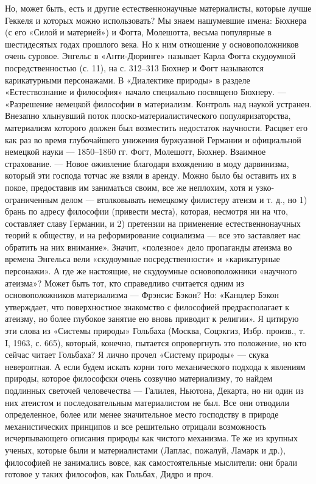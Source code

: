 Но, может быть, есть и другие естественнонаучные материалисты, которые
лучше  Геккеля  и  которых  можно использовать?  Мы  знаем  нашумевшие
имена:  Бюхнера  (с  его  «Силой  и  материей»)  и  Фогта,  Молешотта,
весьма  популярные  в  шестидесятых  годах прошлого  века.  Но  к  ним
отношение у  основоположников очень суровое. Энгельс  в «Анти-Дюринге»
называет  Карла  Фогта скудоумной  посредственностью  (с.  11), на  с.
312--313  Бюхнер  и  Фогт   называются  карикатурными  персонажами.  В
«Диалектике  природы» в  разделе «Естествознание  и философия»  начало
специально  посвящено Бюхнеру.  --- «Разрешение  немецкой философии  в
материализм. Контроль  над наукой  устранен. Внезапно  хлынувший поток
плоско-материалистического  популяризаторства,   материализм  которого
должен был  возместить недостаток  научности. Расцвет  его как  раз во
время глубочайшего унижения буржуазной Германии и официальной немецкой
науки --- 1850--1860 гг. Фогт, Молешотт, Бюхнер. Взаимное страхование.
---  Новое оживление  благодаря вхождению  в моду  дарвинизма, который
эти  господа  тотчас  же  взяли  в  аренду.  Можно  было  бы  оставить
их  в  покое,  предоставив  им  заниматься  своим,  все  же  неплохим,
хотя и  узко-ограниченным делом  --- втолковывать  немецкому филистеру
атеизм и  т. д.,  но 1)  брань по  адресу философии  (привести места),
которая,  несмотря  ни  на  что,   составляет  славу  Германии,  и  2)
претензии  на  применение  естественнонаучных  теорий  к  обществу,  и
на  реформирование  социализма ---  все  это  заставляет нас  обратить
на  них  внимание».  Значит,  «полезное» дело  пропаганды  атеизма  во
времена  Энгельса вели  «скудоумные посредственности»  и «карикатурные
персонажи».  А   где  же  настоящие,  не   скудоумные  основоположники
«научного атеизма»? Может быть тот, кто справедливо считается одним из
основоположников материализма  --- Фрэнсис  Бэкон? Но:  «Канцлер Бэкон
утверждает, что поверхностное  знакомство с философией предрасполагает
к атеизму, но  более глубокое занятие ею вновь приводит  к религии». Я
цитирую  эти слова  из «Системы  природы» Гольбаха  (Москва, Соцэкгиз,
Избр.  произв.,  т.  I,  1963, с.  665),  который,  конечно,  пытается
опровергнуть это  положение, но  кто сейчас  читает Гольбаха?  Я лично
прочел  «Систему   природы»  ---  скука  невероятная.   А  если  будем
искать корни  того механического  подхода к явлениям  природы, которое
философски очень  созвучно материализму, то найдем  подлинных светочей
человечества  ---  Галилея,  Ньютона,  Декарта,  но  ни  один  из  них
атеистом  и последовательным  материалистом не  был. Все  они отводили
определенное, более или менее  значительное место господству в природе
механистических  принципов  и   все  решительно  отрицали  возможность
исчерпывающего  описания  природы  как  чистого механизма.  Те  же  из
крупных ученых, которые были и материалистами (Лаплас, пожалуй, Ламарк
и др.), философией не занимались вовсе, как самостоятельные мыслители:
они брали готовое у таких философов, как Гольбах, Дидро и проч.

